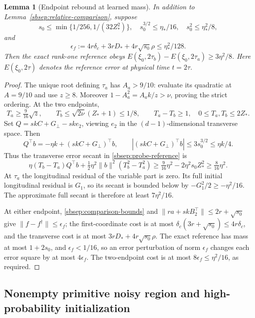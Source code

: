 \documentclass[11pt]{article}
\newtheorem{lemma}[theorem]{Lemma}
\theoremstyle{remark}
\begin{document}
\begin{lemma}[Endpoint rebound at learned mass]
\label{sbsep:reference-rebound}
In addition to Lemma~\ref{sbsep:relative-comparison}, suppose
\begin{equation}\label{sbsep:rebound-caps}
 s_0\le\min\{1/256,1/(32Z_*^2)\},\quad
 s_0^{3/2}\le\eta_*/16,\quad s_0^2\le\eta_*^2/8,
\end{equation}
and
\begin{equation}\label{sbsep:output-cap}
 \epsilon_f:=4r\delta_c+3rD_*+4r\sqrt{s_0}\rho
 \le\eta_*^2/128.
\end{equation}
Then the exact rank-one reference obeys
$E(\xi_0,2\tau_b)-E(\xi_0,2\tau_a)\ge3\eta^2/8$.
Here $E(\xi_0,2\tau)$ denotes the reference error at physical time
$t=2\tau$.
\end{lemma}
\begin{proof}
The unique root defining $\tau_a$ has $A_a>9/10$: evaluate its quadratic
at $A=9/10$ and use $z\ge8$. Moreover
$1-A_a^2=A_ak/z>\nu$, proving the strict ordering.
At the two endpoints,
\[
 T_a\ge\tfrac9{16}\sqrt z,\qquad
 T_b\le\sqrt{2\nu}(Z_*+1)\le1/8,
 \qquad T_a-T_b\ge1,\quad 0\le T_a,T_b\le2Z_*.
\]
Set $Q=skC+G_\perp-sk e_2$, viewing $e_2$ in the $(d-1)$-dimensional
transverse space. Then
\[
 Q^\top b=-\eta k+(skC+G_\perp)^\top b,
 \qquad |(skC+G_\perp)^\top b|\le3s_0^{3/2}\le\eta k/4.
\]
Thus the transverse error secant in \eqref{sbsep:probe-reference} is
\[
 \eta(T_b-T_a)Q^\top b+
 \tfrac12\eta^2\|b\|^2(T_b^2-T_a^2)
 \ge\tfrac9{16}\eta^2-2\eta^2s_0Z_*^2
 \ge\tfrac8{16}\eta^2.
\]
At $\tau_a$ the longitudinal residual of the variable part is zero.
Its full initial longitudinal residual is $G_1$, so its secant is
bounded below by $-G_1^2/2\ge-\eta^2/16$.
The approximate full secant is therefore at least $7\eta^2/16$.

At either endpoint, \eqref{sbsep:comparison-bounds} and
$\|ra+skB_2^\top\|\le2r+\sqrt{s_0}$ give
$\|f-f^\dagger\|\le\epsilon_f$; the first-coordinate cost is at most
$\delta_c(3r+\sqrt{s_0})\le4r\delta_c$, and the transverse cost is
at most $3rD_*+4r\sqrt{s_0}\rho$.
The exact reference has mass at most $1+2s_0$, and $\epsilon_f<1/16$,
so an error perturbation of norm $\epsilon_f$ changes each error square
by at most $4\epsilon_f$. The two-endpoint cost is at most
$8\epsilon_f\le\eta^2/16$, as required.
\end{proof}

\subsection{Nonempty primitive noisy region and high-probability initialization}
\end{document}
